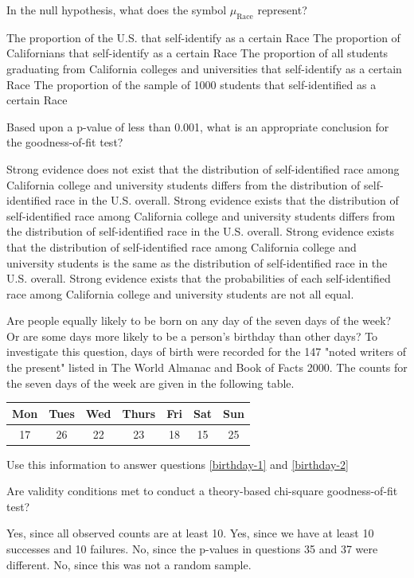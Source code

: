 \documentclass{article}
\begin{document}
\begin{mcquestions}
		\question In the null hypothesis, what does the symbol \(\mu_{\text{Race}}\) represent? \label{census-1}
		\begin{mcanswerslist}
			\answer  The proportion of the U.S. that self-identify as a certain Race
			\answer  The proportion of Californians that self-identify as a certain Race
			\answer[correct]  The proportion of all students graduating from California colleges and universities that self-identify as a certain Race
			\answer  The proportion of the sample of 1000 students that self-identified as a certain Race
		\end{mcanswerslist}
		
		\question[follow] Based upon a p-value of less than 0.001, what is an appropriate conclusion for the goodness-of-fit test? \label{census-2}
		\begin{mcanswerslist}
			\answer  Strong evidence does not exist that the distribution of self-identified race among California college and university students differs from the distribution of self-identified race in the U.S. overall.
			\answer[correct]  Strong evidence exists that the distribution of self-identified race among California college and university students differs from the distribution of self-identified race in the U.S. overall.
			\answer  Strong evidence exists that the distribution of self-identified race among California college and university students is the same as the distribution of self-identified race in the U.S. overall.
			\answer  Strong evidence exists that the probabilities of each self-identified race among California college and university students are not all equal.
		\end{mcanswerslist}
		
		\begin{mcquestioninstruction}
			Are people equally likely to be born on any day of the seven days of the week? Or are some days more likely to be a person's birthday than other days?  To investigate this question, days of birth were recorded for the 147 "noted writers of the present" listed in The World Almanac and Book of Facts 2000. The counts for the seven days of the week are given in the following table.
			\begin{center}
				\begin{tabular}{ccccccc}
					Mon&Tues&Wed&Thurs&Fri&Sat&Sun\\ \hline
					17&26&22&23&18&15&25					
				\end{tabular}
			\end{center}
			Use this information to answer questions \ref{birthday-1} and \ref{birthday-2}
		\end{mcquestioninstruction}
		\question Are validity conditions met to conduct a theory-based chi-square goodness-of-fit test? \label{birthday-1}
		\begin{mcanswerslist}
			\answer[correct]  Yes, since all observed counts are at least 10.
			\answer  Yes, since we have at least 10 successes and 10 failures.
			\answer  No, since the p-values in questions 35 and 37 were different.
			\answer  No, since this was not a random sample.
		\end{mcanswerslist}
		

\end{mcquestions}
\end{document}

